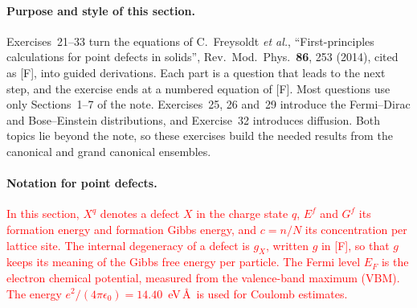 \documentclass[11pt]{article}      %
\numberwithin{equation}{section}   %
\begin{document}
\paragraph{Purpose and style of this section.}
Exercises~21--33 turn the equations of C.~Freysoldt \textit{et al.}, ``First-principles calculations for point defects in solids'', Rev.\ Mod.\ Phys.\ \textbf{86}, 253 (2014), cited as [F], into guided derivations.
Each part is a question that leads to the next step, and the exercise ends at a numbered equation of [F].
Most questions use only Sections~1--7 of the note.
Exercises~25, 26 and~29 introduce the Fermi--Dirac and Bose--Einstein distributions, and Exercise~32 introduces diffusion.
Both topics lie beyond the note, so these exercises build the needed results from the canonical and grand canonical ensembles.

\paragraph{Notation for point defects.}
\textcolor{red}{In this section, $X^q$ denotes a defect $X$ in the charge state $q$, $E^f$ and $G^f$ its formation energy and formation Gibbs energy, and $c = n/N$ its concentration per lattice site.
The internal degeneracy of a defect is $g_X$, written $g$ in [F], so that $g$ keeps its meaning of the Gibbs free energy per particle.
The Fermi level $E_F$ is the electron chemical potential, measured from the valence-band maximum (VBM).
The energy $e^2/(4\pi\epsilon_0) = 14.40$~eV\,\AA\ is used for Coulomb estimates.}
\end{document}
